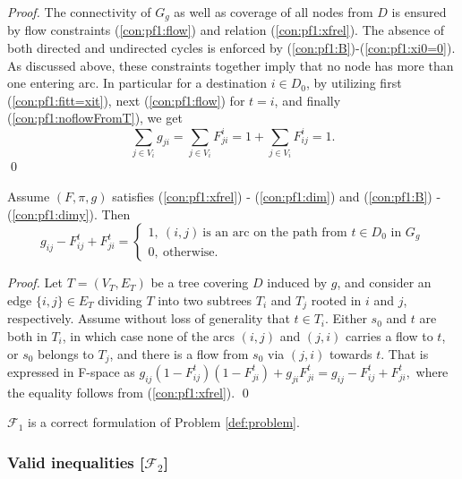 \begin{proof}
The connectivity of $G_{g}$ as well as coverage of all nodes from $D$ is ensured by flow constraints (\ref{con:pf1:flow}) and relation (\ref{con:pf1:xfrel}).
The absence of both directed and undirected cycles is enforced by (\ref{con:pf1:B})-(\ref{con:pf1:xi0=0}).
As discussed above, these constraints together imply that no node has more than one entering arc.
In particular for a destination $i\in D_0$, by utilizing first (\ref{con:pf1:fitt=xit}), next (\ref{con:pf1:flow}) for $t=i$, and finally (\ref{con:pf1:noflowFromT}), we get
$$\sum_{j\in V_i}g_{ji}=\sum_{j\in V_i}F_{ji}^i = 1+\sum_{j\in V_i}F_{ij}^i=1.$$
\qed
\end{proof}


\begin{prop}\label{prop:transx}
Assume $(F,\pi,g)$ satisfies (\ref{con:pf1:xfrel}) - (\ref{con:pf1:dim}) and  (\ref{con:pf1:B}) - (\ref{con:pf1:dimy}). Then
$$
g_{ij} - F^t_{ij}+F^t_{ji} = 
	\begin{cases}
		1, ~(i,j)~\text{is an arc on the path from~$t\in D_0$ in $G_{g}$} \\
		0, ~\text{otherwise.}
	\end{cases}
$$
\end{prop}
%
\begin{proof}
Let $T=(V_T,E_T)$ be a tree covering $D$ induced by $g$, and consider an edge $\{i,j\}\in E_T$ dividing $T$ into two subtrees $T_i$ and $T_j$ rooted in $i$ and $j$, respectively.
Assume without loss of generality that $t\in T_i$.
Either $s_0$ and $t$ are both in $T_i$, in which case none of the arcs $(i,j)$ and $(j,i)$ carries a flow to $t$, or $s_0$ belongs to $T_j$, and there is a flow from $s_0$ via $(j,i)$ towards $t$.
That is expressed in F-space as
$
g_{ij}(1-F^{t}_{ij})(1-F^{t}_{ji})+g_{ji}F^{t}_{ji}=g_{ij} - F^t_{ij}+F^t_{ji},
$
where the equality follows from (\ref{con:pf1:xfrel}).
\qed
\end{proof}

\begin{cor}
$\mathcal{F}_1$ is a correct formulation of Problem \ref{def:problem}.
\end{cor}

\subsubsection{Valid inequalities [$\mathcal{F}_2$]}

